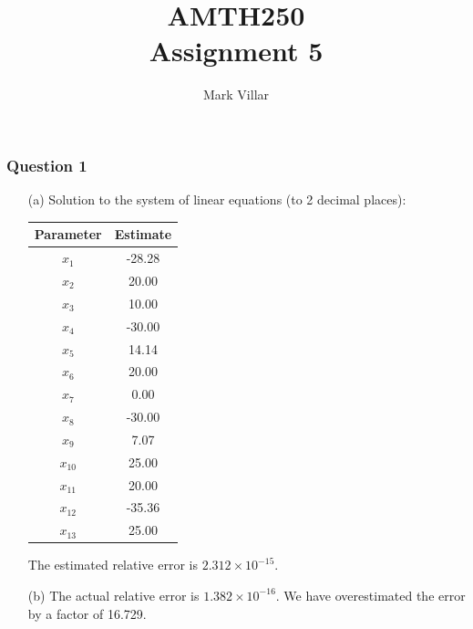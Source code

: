 \documentclass[11pt,a4paper]{article}
\title{AMTH250 \\ Assignment 5}
\author{Mark Villar}
\begin{document}
\maketitle

\subsubsection*{Question 1} 
\begin{enumerate}
	\item[(a)] Solution to the system of linear equations (to 2 decimal places):
	\begin{center}
		\begin{tabular}{|c|c|}
		\hline
		Parameter &Estimate \\
		\hline
			$x_1$ &-28.28 \\
			$x_2$ &20.00 \\
			$x_3$ &10.00 \\
			$x_4$ &-30.00 \\
			$x_5$ &14.14 \\
			$x_6$ &20.00 \\
			$x_7$ &0.00 \\
			$x_8$ &-30.00 \\
			$x_9$ &7.07 \\
			$x_{10}$ &25.00 \\
			$x_{11}$ &20.00 \\
			$x_{12}$ &-35.36 \\
			$x_{13}$ &25.00 \\
		\hline
		\end{tabular}
	\end{center}
	The estimated relative error is $2.312\times10^{-15}$.
		
	\item[(b)] The actual relative error is $1.382\times10^{-16}$. We have overestimated the error by a factor of 16.729.


\end{enumerate}
\end{document}

